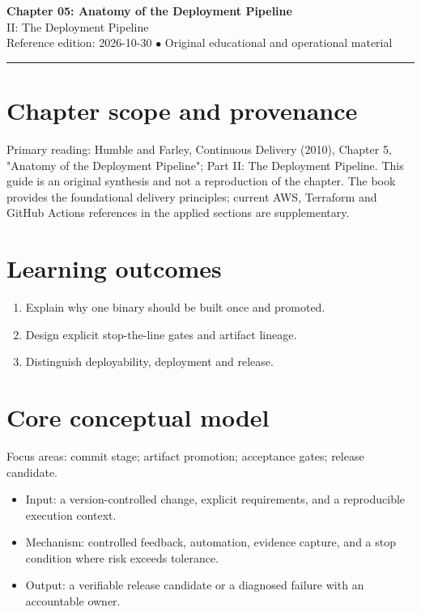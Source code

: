 \documentclass[10pt,letterpaper]{article}
\begin{document}
\begin{center}
{\LARGE\bfseries\color{cdblue}Chapter 05: Anatomy of the Deployment Pipeline}\\[7pt]
{\large II: The Deployment Pipeline}\\[6pt]
{\small Reference edition: 2026-10-30 $\bullet$ Original educational and operational material}
\end{center}
\noindent\color{cdblue}\rule{\linewidth}{1.2pt}\color{black}
\vspace{0.4em}
\section{Chapter scope and provenance}
Primary reading: Humble and Farley, Continuous Delivery (2010), Chapter 5, "Anatomy of the Deployment Pipeline"; Part II: The Deployment Pipeline. This guide is an original synthesis and not a reproduction of the chapter. The book provides the foundational delivery principles; current AWS, Terraform and GitHub Actions references in the applied sections are supplementary.


\section{Learning outcomes}
\begin{enumerate}
\item Explain why one binary should be built once and promoted.
\item Design explicit stop-the-line gates and artifact lineage.
\item Distinguish deployability, deployment and release.
\end{enumerate}

\section{Core conceptual model}
Focus areas: commit stage; artifact promotion; acceptance gates; release candidate.

\begin{itemize}
\item Input: a version-controlled change, explicit requirements, and a reproducible execution context.
\item Mechanism: controlled feedback, automation, evidence capture, and a stop condition where risk exceeds tolerance.
\item Output: a verifiable release candidate or a diagnosed failure with an accountable owner.
\end{itemize}
\end{document}
